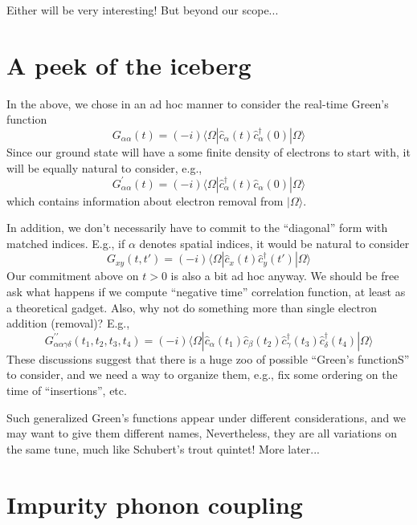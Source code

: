 Either will be very interesting! But beyond our scope...

\section{A peek of the iceberg}

In the above, we chose in an ad hoc manner to consider the real-time Green's function
\[ G_{\alpha \alpha}\left( t \right) =\left( -i \right) \langle \Omega |\hat{c}_{\alpha}\left( t \right) \hat{c}_{\alpha}^{\dagger}\left( 0 \right) |\Omega \rangle \]
Since our ground state will have a some finite density of electrons to start with, it will be equally natural to consider, e.g.,
\[ G_{\alpha \alpha}^{\prime}\left( t \right) =\left( -i \right) \langle \Omega |\hat{c}_{\alpha}^{\dagger}\left( t \right) \hat{c}_{\alpha}\left( 0 \right) |\Omega \rangle \]
which contains information about electron removal from $|\Omega\rangle$.

In addition, we don't necessarily have to commit to the ``diagonal'' form with matched indices. E.g., if $\alpha$ denotes spatial indices, it would be natural to consider
\[ G_{xy}\left( t,t' \right) =\left( -i \right) \langle \Omega |\hat{c}_x\left( t \right) \hat{c}_{y}^{\dagger}\left( t' \right) |\Omega \rangle \]
Our commitment above on $t>0$ is also a bit ad hoc anyway. We should be free ask what happens if we compute ``negative time'' correlation function, at least as a theoretical gadget. Also, why not do something more than single electron addition (removal)? E.g.,
\[ G_{\alpha \alpha \gamma \delta}^{\prime\prime}\left( t_1,t_2,t_3,t_4 \right) =\left( -i \right) \langle \Omega |\hat{c}_{\alpha}\left( t_1 \right) \hat{c}_{\beta}\left( t_2 \right) \hat{c}_{\gamma}^{\dagger}\left( t_3 \right) \hat{c}_{\delta}^{\dagger}\left( t_4 \right) |\Omega \rangle \]
These discussions suggest that there is a huge zoo of possible ``Green's functionS'' to consider, and we need a way to organize them, e.g., fix some ordering on the time of ``insertions'', etc.

Such generalized Green's functions appear under different considerations, and we may want to give them different names, Nevertheless, they are all variations on the same tune, much like Schubert's trout quintet! More later...

\section{Impurity phonon coupling}


